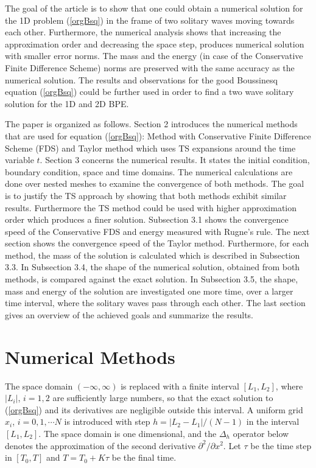 \documentclass[%
 aip,
cp,  
 amsmath,amssymb,
 reprint,
]{iopconfser}
\newcommand{\rf}[1]{(\ref{#1})}
\begin{document}
The goal of the article is to show that one could obtain a numerical solution for the 1D problem \rf{orgBsq} in the frame of two solitary waves moving towards each other. Furthermore, the numerical analysis shows that increasing the approximation order and decreasing the space step, produces  numerical solution with smaller error norms. The mass and the energy (in case of the Conservative Finite Difference Scheme) norms are preserved with the same accuracy as the numerical solution. The results and observations for the good Boussinesq equation \rf{orgBsq} could be further used in order to find a two wave solitary solution for the 1D and 2D BPE.

The paper is organized as follows. Section 2 introduces the numerical methods that are used for equation \rf{orgBsq}: Method with Conservative Finite Difference Scheme (FDS) and Taylor method which uses TS expansions around the time variable $t$. Section 3 concerns the numerical results. It states the initial condition, boundary condition, space and time domains. The numerical calculations are done over nested meshes to examine the convergence of both methods. The goal is to justify the TS approach by showing that both methods exhibit similar results. Furthermore the TS method could be used with higher approximation order which produces a finer solution. Subsection 3.1 shows the convergence speed of the Conservative FDS and energy measured with Rugne's rule. The next section shows the convergence speed of the Taylor method. Furthermore, for each method, the mass of the solution is calculated which is described in Subsection 3.3. In Subsection 3.4, the shape of the numerical solution, obtained from both methods, is compared against the exact solution. In Subsection 3.5, the shape, mass and energy of the solution are investigated one more time, over a larger time interval, where the solitary waves pass through each other. The last section gives an overview of the achieved goals and summarize the results.

\section{Numerical Methods}

The space domain $(-\infty,\infty)$ is replaced with a finite  interval $[L_1,L_2]$, where $|L_i|$, $i=1,2$ are sufficiently large numbers, so that the exact solution to \rf{orgBsq} and its derivatives are negligible outside this interval. A uniform grid $x_i$,  $i=0,1,\cdots N$ is introduced with step $h=|L_2-L_1|/(N-1)$ in the interval $[L_1,L_2]$. The space domain is one dimensional, and the $\Delta_h$ operator below denotes the approximation of the second derivative $\partial^2/\partial x^2$.
Let $\tau$ be the time step in $[T_0,T]$ and $T=T_0+K \tau$ be the final time. 
\end{document}
